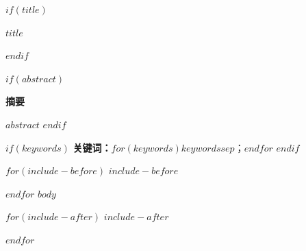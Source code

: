 \documentclass[a4paper,12pt]{ctexart}
\begin{document}
\thispagestyle{fancy}
$if(title)$
\begin{center}
  {\heiti{}\bfseries $title$}
\end{center}
$endif$

$if(abstract)$
\vspace{1.1em}
\begin{center}
  {\heiti{}\bfseries 摘\quad 要}
\end{center}
\vspace{0.4em}

$abstract$
$endif$

$if(keywords)$
\vspace{0.5em}
\noindent\textbf{关键词：}$for(keywords)$$keywords$$sep$；$endfor$
$endif$

\newpage
$for(include-before)$
$include-before$

$endfor$
$body$

$for(include-after)$
$include-after$

$endfor$
\end{document}
